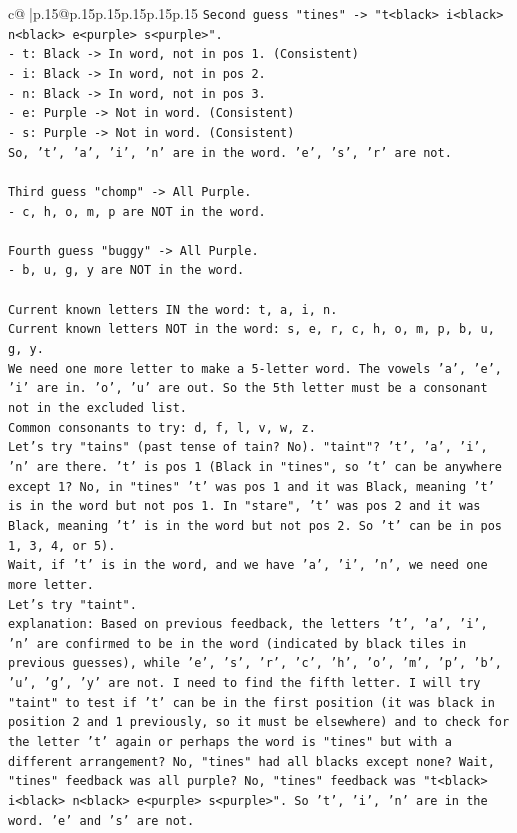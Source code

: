\documentclass{article}
\begin{document}
{\begin{supertabular}{c@{$\;$}|p{.15\linewidth}@{}p{.15\linewidth}p{.15\linewidth}p{.15\linewidth}p{.15\linewidth}p{.15\linewidth}}
{{{\texttt{Second guess "tines" {-}> "t<black> i<black> n<black> e<purple> s<purple>".} \\
\texttt{{-} t: Black {-}> In word, not in pos 1. (Consistent)} \\
\texttt{{-} i: Black {-}> In word, not in pos 2.} \\
\texttt{{-} n: Black {-}> In word, not in pos 3.} \\
\texttt{{-} e: Purple {-}> Not in word. (Consistent)} \\
\texttt{{-} s: Purple {-}> Not in word. (Consistent)} \\
\texttt{So, 't', 'a', 'i', 'n' are in the word. 'e', 's', 'r' are not.} \\
\\ 
\texttt{Third guess "chomp" {-}> All Purple.} \\
\texttt{{-} c, h, o, m, p are NOT in the word.} \\
\\ 
\texttt{Fourth guess "buggy" {-}> All Purple.} \\
\texttt{{-} b, u, g, y are NOT in the word.} \\
\\ 
\texttt{Current known letters IN the word: t, a, i, n.} \\
\texttt{Current known letters NOT in the word: s, e, r, c, h, o, m, p, b, u, g, y.} \\
\texttt{We need one more letter to make a 5{-}letter word. The vowels 'a', 'e', 'i' are in. 'o', 'u' are out. So the 5th letter must be a consonant not in the excluded list.} \\
\texttt{Common consonants to try: d, f, l, v, w, z.} \\
\texttt{Let's try "tains" (past tense of tain? No). "taint"? 't', 'a', 'i', 'n' are there. 't' is pos 1 (Black in "tines", so 't' can be anywhere except 1? No, in "tines" 't' was pos 1 and it was Black, meaning 't' is in the word but not pos 1. In "stare", 't' was pos 2 and it was Black, meaning 't' is in the word but not pos 2. So 't' can be in pos 1, 3, 4, or 5).} \\
\texttt{Wait, if 't' is in the word, and we have 'a', 'i', 'n', we need one more letter.} \\
\texttt{Let's try "taint".} \\
\texttt{explanation: Based on previous feedback, the letters 't', 'a', 'i', 'n' are confirmed to be in the word (indicated by black tiles in previous guesses), while 'e', 's', 'r', 'c', 'h', 'o', 'm', 'p', 'b', 'u', 'g', 'y' are not. I need to find the fifth letter. I will try "taint" to test if 't' can be in the first position (it was black in position 2 and 1 previously, so it must be elsewhere) and to check for the letter 't' again or perhaps the word is "tines" but with a different arrangement? No, "tines" had all blacks except none? Wait, "tines" feedback was all purple? No, "tines" feedback was "t<black> i<black> n<black> e<purple> s<purple>". So 't', 'i', 'n' are in the word. 'e' and 's' are not.} \\
}}}
\end{supertabular}}
\end{document}
